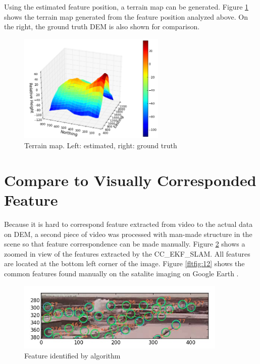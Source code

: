 Using the estimated feature position, a terrain map can be generated.
Figure \ref{fltfig:10} shows the terrain map generated from the
feature position analyzed above. On the right, the ground truth DEM is
also shown for comparison. 

\begin{figure}[h]
\centering
\includegraphics[width=7cm, keepaspectratio=true]
{./Figures/fltfig/cut1/Figure90.png}
\caption{Terrain map. Left: estimated, right: ground truth }
\label{fltfig:10}
\end{figure}

\section{Compare to Visually Corresponded Feature}
Because it is hard to correspond feature extracted from video to the
actual data on DEM, a second piece of video was processed with
man-made structure in the scene so that feature correspondence can be
made manually. Figure \ref{fltfig:11} shows a zoomed in view of the
features extracted by the CC\_EKF\_SLAM. All features are located at
the bottom left corner of the image. Figure \ref{fltfig:12} shows the
common features found manually on the satalite imaging on Google Earth
\cite{}.

\begin{figure}[h]
\centering
\includegraphics[width=10cm, keepaspectratio=true]
{./Figures/fltfig/airport/frame398_features.jpg}
\caption{Feature identified by algorithm }
\label{fltfig:11}
\end{figure}

